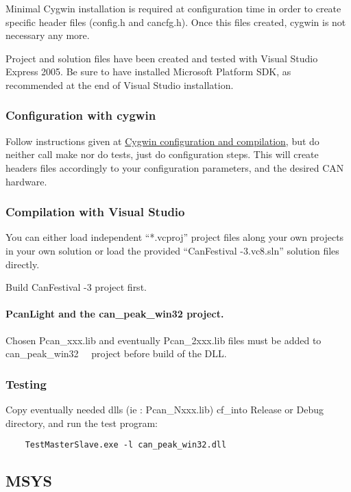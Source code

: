 \documentclass[12pt,english,a4paper]{book}
\begin{document}
Minimal Cygwin installation is required at configuration time in order
to create specific header files (config.h and cancfg.h). Once this
files created, cygwin is not necessary any more.

Project and solution files have been created and tested with Visual
Studio Express 2005. Be sure to have installed Microsoft Platform
SDK, as recommended at the end of Visual Studio installation.


\subsubsection{Configuration with cygwin}

Follow instructions given at \hyperlink{Cygwin configuration and compilation}{Cygwin
configuration and compilation}, but do neither call make nor do tests,
just do configuration steps. This will create headers files accordingly
to your configuration parameters, and the desired CAN hardware.


\subsubsection{Compilation with Visual Studio}

You can either load independent {}``{*}.vcproj'' project files
along your own projects in your own solution or load the provided
{}``CanFestival -3.vc8.sln'' solution files directly.

Build CanFestival -3 project first.


\paragraph{PcanLight and the can\_peak\_win32 project.}

Chosen Pcan\_xxx.lib and eventually Pcan\_2xxx.lib files must be added
to can\_peak\_win32 \ \ project before build of the DLL.


\subsubsection{Testing}

Copy eventually needed dlls (ie : Pcan\_Nxxx.lib) cf_into Release or
Debug directory, and run the test program:


\begin{verbatim}
	TestMasterSlave.exe -l can_peak_win32.dll
\end{verbatim}


\subsection{MSYS}
\end{document}
